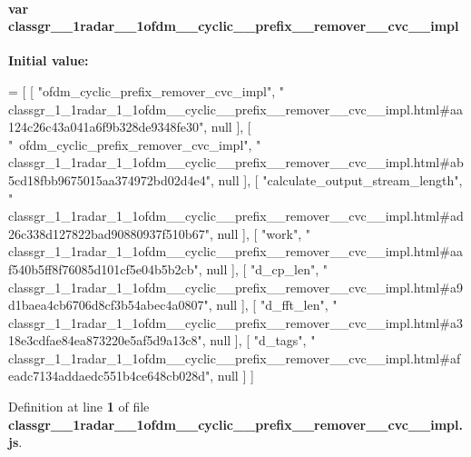 \paragraph[{classgr\+\_\+1\+\_\+1radar\+\_\+1\+\_\+1ofdm\+\_\+\+\_\+cyclic\+\_\+\+\_\+prefix\+\_\+\+\_\+remover\+\_\+\+\_\+cvc\+\_\+\+\_\+impl}]{\setlength{\rightskip}{0pt plus 5cm}var classgr\+\_\+\_\+1radar\+\_\+\_\+1ofdm\+\_\+\+\_\+cyclic\+\_\+\+\_\+prefix\+\_\+\+\_\+remover\+\_\+\+\_\+cvc\+\_\+\+\_\+impl}\label{classgr__1__1radar__1__1ofdm____cyclic____prefix____remover____cvc____impl_8js_af6874c7dbd5be19d376b8f33acabea76}
{\bfseries Initial value\+:}
\begin{DoxyCode}
=
[
    [ \textcolor{stringliteral}{"ofdm\_cyclic\_prefix\_remover\_cvc\_impl"}, \textcolor{stringliteral}{"
      classgr\_1\_1radar\_1\_1ofdm\_\_cyclic\_\_prefix\_\_remover\_\_cvc\_\_impl.html#aa124c26c43a041a6f9b328de9348fe30"}, null ],
    [ \textcolor{stringliteral}{"~ofdm\_cyclic\_prefix\_remover\_cvc\_impl"}, \textcolor{stringliteral}{"
      classgr\_1\_1radar\_1\_1ofdm\_\_cyclic\_\_prefix\_\_remover\_\_cvc\_\_impl.html#ab5cd18fbb9675015aa374972bd02d4e4"}, null ],
    [ \textcolor{stringliteral}{"calculate\_output\_stream\_length"}, \textcolor{stringliteral}{"
      classgr\_1\_1radar\_1\_1ofdm\_\_cyclic\_\_prefix\_\_remover\_\_cvc\_\_impl.html#ad26c338d127822bad90880937f510b67"}, null ],
    [ \textcolor{stringliteral}{"work"}, \textcolor{stringliteral}{"
      classgr\_1\_1radar\_1\_1ofdm\_\_cyclic\_\_prefix\_\_remover\_\_cvc\_\_impl.html#aaf540b5ff8f76085d101cf5e04b5b2cb"}, null ],
    [ \textcolor{stringliteral}{"d\_cp\_len"}, \textcolor{stringliteral}{"
      classgr\_1\_1radar\_1\_1ofdm\_\_cyclic\_\_prefix\_\_remover\_\_cvc\_\_impl.html#a9d1baea4cb6706d8cf3b54abec4a0807"}, null ],
    [ \textcolor{stringliteral}{"d\_fft\_len"}, \textcolor{stringliteral}{"
      classgr\_1\_1radar\_1\_1ofdm\_\_cyclic\_\_prefix\_\_remover\_\_cvc\_\_impl.html#a318e3cdfae84ea873220e5af5d9a13c8"}, null ],
    [ \textcolor{stringliteral}{"d\_tags"}, \textcolor{stringliteral}{"
      classgr\_1\_1radar\_1\_1ofdm\_\_cyclic\_\_prefix\_\_remover\_\_cvc\_\_impl.html#afeadc7134addaedc551b4ce648cb028d"}, null ]
]
\end{DoxyCode}


Definition at line {\bf 1} of file {\bf classgr\+\_\+\_\+1radar\+\_\+\_\+1ofdm\+\_\+\+\_\+cyclic\+\_\+\+\_\+prefix\+\_\+\+\_\+remover\+\_\+\+\_\+cvc\+\_\+\+\_\+impl.\+js}.

